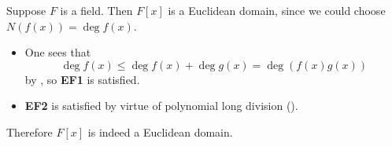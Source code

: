 \begin{example}
    Suppose $F$ is a field. Then $F[x]$ is a Euclidean domain, since we could choose $N(f(x)) = \deg f(x)$.
    \begin{itemize}
        \item One sees that
        \[
            \deg f(x) \leq \deg f(x) + \deg g(x) = \deg(f(x)g(x))
        \]
        by , so \textbf{EF1} is satisfied.

        \item \textbf{EF2} is satisfied by virtue of polynomial long division ().
    \end{itemize}
    Therefore $F[x]$ is indeed a Euclidean domain.
\end{example}

